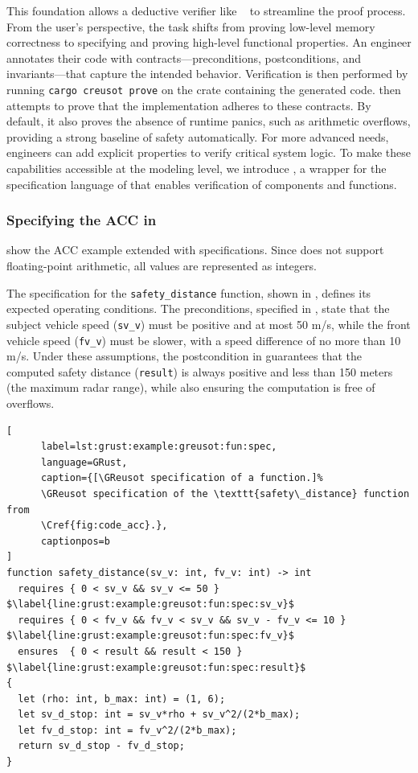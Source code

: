This foundation allows a deductive verifier like \Creusot~ \cite{DBLP:conf/icfem/DenisJM22} to
streamline the proof process. From the user's perspective, the task shifts from proving low-level
memory correctness to specifying and proving high-level functional properties. An engineer annotates
their code with contracts---preconditions, postconditions, and invariants---that capture the
intended behavior. Verification is then performed by running \texttt{cargo creusot prove} on the
crate containing the generated code. \Creusot then attempts to prove that the implementation adheres
to these contracts.
%
By default, it also proves the absence of runtime panics, such as arithmetic overflows, providing a
strong baseline of safety automatically. For more advanced needs, engineers can add explicit
properties to verify critical system logic. To make these capabilities accessible at the modeling
level, we introduce \GReusot, a wrapper for the specification language of \Creusot that enables
verification of \GRSync components and functions.

\subsubsection{Specifying the ACC in \GReusot}
\label{sec:grust:example:greusot:acc}

 show the ACC example
extended with \GReusot specifications. Since \Creusot does not support
floating-point arithmetic, all values are represented as integers.

The specification for the \texttt{safety\_distance} function, shown in
, defines its expected operating conditions. The
preconditions, specified in
, state that
the subject vehicle speed (\texttt{sv\_v}) must be positive and at most 50 m/s, while
the front vehicle speed (\texttt{fv\_v}) must be slower, with a speed difference of no
more than 10 m/s. Under these assumptions, the postcondition in
 guarantees that the computed safety
distance (\texttt{result}) is always positive and less than 150 meters (the maximum
radar range), while also ensuring the computation is free of overflows.

\begin{lstlisting}[
      label=lst:grust:example:greusot:fun:spec,
      language=GRust, 
      caption={[\GReusot specification of a function.]%
      \GReusot specification of the \texttt{safety\_distance} function from 
      \Cref{fig:code_acc}.},
      captionpos=b
]
function safety_distance(sv_v: int, fv_v: int) -> int
  requires { 0 < sv_v && sv_v <= 50 } $\label{line:grust:example:greusot:fun:spec:sv_v}$
  requires { 0 < fv_v && fv_v < sv_v && sv_v - fv_v <= 10 } $\label{line:grust:example:greusot:fun:spec:fv_v}$
  ensures  { 0 < result && result < 150 } $\label{line:grust:example:greusot:fun:spec:result}$
{
  let (rho: int, b_max: int) = (1, 6);
  let sv_d_stop: int = sv_v*rho + sv_v^2/(2*b_max);
  let fv_d_stop: int = fv_v^2/(2*b_max);
  return sv_d_stop - fv_d_stop;
}
\end{lstlisting}


